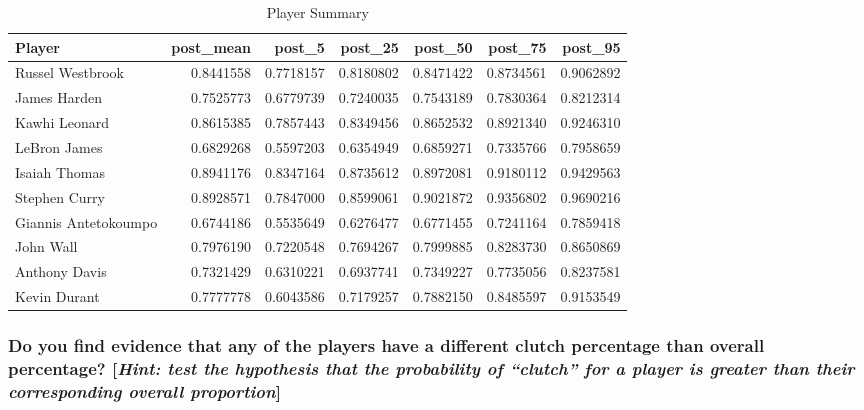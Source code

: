 \documentclass[
]{article}
\begin{document}
\begin{table}[H]

\caption{\label{tab:unnamed-chunk-6}Player Summary}
\centering
\begin{tabular}[t]{lrrrrrr}
\toprule
Player & post\_mean & post\_5 & post\_25 & post\_50 & post\_75 & post\_95\\
\midrule
Russel Westbrook & 0.8441558 & 0.7718157 & 0.8180802 & 0.8471422 & 0.8734561 & 0.9062892\\
James Harden & 0.7525773 & 0.6779739 & 0.7240035 & 0.7543189 & 0.7830364 & 0.8212314\\
Kawhi Leonard & 0.8615385 & 0.7857443 & 0.8349456 & 0.8652532 & 0.8921340 & 0.9246310\\
LeBron James & 0.6829268 & 0.5597203 & 0.6354949 & 0.6859271 & 0.7335766 & 0.7958659\\
Isaiah Thomas & 0.8941176 & 0.8347164 & 0.8735612 & 0.8972081 & 0.9180112 & 0.9429563\\
\addlinespace
Stephen Curry & 0.8928571 & 0.7847000 & 0.8599061 & 0.9021872 & 0.9356802 & 0.9690216\\
Giannis Antetokoumpo & 0.6744186 & 0.5535649 & 0.6276477 & 0.6771455 & 0.7241164 & 0.7859418\\
John Wall & 0.7976190 & 0.7220548 & 0.7694267 & 0.7999885 & 0.8283730 & 0.8650869\\
Anthony Davis & 0.7321429 & 0.6310221 & 0.6937741 & 0.7349227 & 0.7735056 & 0.8237581\\
Kevin Durant & 0.7777778 & 0.6043586 & 0.7179257 & 0.7882150 & 0.8485597 & 0.9153549\\
\bottomrule
\end{tabular}
\end{table}

\hypertarget{do-you-find-evidence-that-any-of-the-players-have-a-different-clutch-percentage-than-overall-percentage-hint-test-the-hypothesis-that-the-probability-of-clutch-for-a-player-is-greater-than-their-corresponding-overall-proportion}{%
\subsubsection{\texorpdfstring{Do you find evidence that any of the
players have a different clutch percentage than overall percentage?
{[}\emph{Hint: test the hypothesis that the probability of ``clutch''
for a player is greater than their corresponding overall
proportion}{]}}{Do you find evidence that any of the players have a different clutch percentage than overall percentage? {[}Hint: test the hypothesis that the probability of ``clutch'' for a player is greater than their corresponding overall proportion{]}}}\label{do-you-find-evidence-that-any-of-the-players-have-a-different-clutch-percentage-than-overall-percentage-hint-test-the-hypothesis-that-the-probability-of-clutch-for-a-player-is-greater-than-their-corresponding-overall-proportion}}
\end{document}

